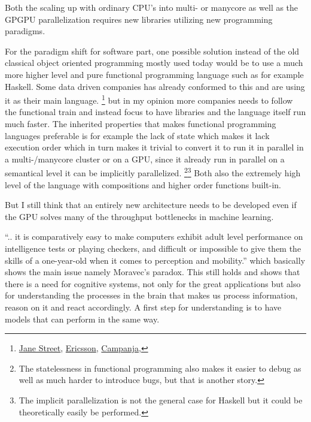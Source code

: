 \documentclass{article}
\begin{document}
    Both the scaling up with ordinary CPU's into multi- or manycore as well as
    the GPGPU parallelization requires new libraries utilizing new programming 
    paradigms.

    For the paradigm shift for software part,
    one possible solution instead of the old classical object oriented
    programming mostly used today would be to use a much more higher level and
    pure functional programming language such as
    for example Haskell. Some data driven companies has
    already conformed to this and are using it as their main language.
    \footnote{
        \href{http://www.janestreet.com}{Jane Street},
        \href{http://www.ericsson.com}{Ericsson},
        \href{http://www.campanja.com}{Campanja},
    }
    but in my opinion more companies needs to follow the functional train and
    instead focus to have libraries and the language itself run much faster.
    The inherited properties that makes functional programming languages 
    preferable is for example the lack of state 
    which makes it lack execution order which in turn makes it
    trivial to convert it to run it in parallel in a multi-/manycore cluster
    or on a GPU, since it already run in parallel on a semantical level 
    it can be implicitly parallelized.\cite{implicitparallel}
    \footnote{The statelessness in functional programming also makes it easier 
    to debug as well as much harder to introduce bugs, but that is another 
    story.}\footnote{The implicit parallelization is not the general case 
    for Haskell but it could be theoretically easily be performed.} 
    Both also the extremely high level of the language with
    compositions and higher order functions built-in.\cite{haskell}

    But I still think that an entirely new architecture needs to be developed 
    even if the GPU solves many of the throughput bottlenecks in machine
    learning.

    ``.. it is comparatively easy to make computers exhibit adult level
    performance on intelligence tests or playing checkers, and difficult or
    impossible to give them the skills of a one-year-old when it comes to
    perception and mobility.''\cite{moravec} which basically shows the main
    issue namely Moravec's paradox. This still holds and shows that there is a 
    need for cognitive systems, not only for the great applications but also
    for understanding the processes in the brain that makes us process
    information, reason on it and react accordingly. A first step for
    understanding is to have models that can perform in the same way.
\end{document}
